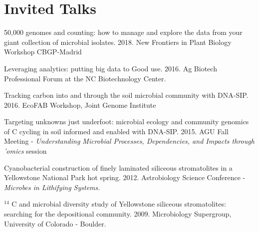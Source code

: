 \documentclass[letterpaper]{article}
\renewenvironment{itemize}{
  \begin{list}{}{
    \setlength{\leftmargin}{1.5em}
  }
}{
  \end{list}
}
\begin{document}
\section*{Invited Talks}
\begin{itemize}
    \item 50,000 genomes and counting: how to manage and explore the data from
        your giant collection of microbial isolates. 2018.
        New Frontiers in Plant Biology Workshop CBGP-Madrid
    \item Leveraging analytics: putting big data to Good use. 2016.
        Ag Biotech Professional Forum at the NC Biotechnology Center.
    \item Tracking carbon into and through the soil microbial community with
        DNA-SIP. 2016. EcoFAB Workshop, Joint Genome Institute
    \item Targeting unknowns just underfoot: microbial ecology and community
        genomics of C cycling in soil informed and enabled with DNA-SIP. 2015.
        AGU Fall Meeting - \textit{Understanding Microbial Processes, Dependencies, and
        Impacts through 'omics} session
    \item
        Cyanobacterial construction of finely laminated siliceous
        stromatolites in a Yellowstone National Park hot spring. 2012.
        Astrobiology Science Conference - \textit{Microbes in Lithifying
        Systems.}
    \item $^{14}$ C and microbial diversity study of Yellowstone siliceous
        stromatolites: searching for the depositional community. 2009.
        Microbiology Supergroup, University of Colorado - Boulder.
\end{itemize}
\end{document}
